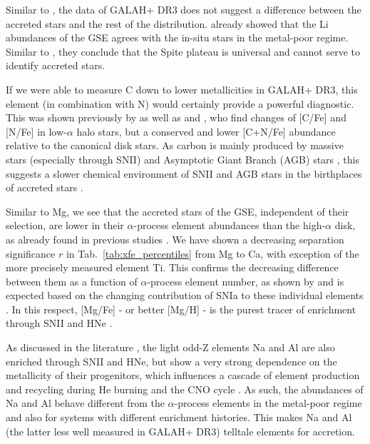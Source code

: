 \documentclass[fleqn,usenatbib]{mnras}
\begin{document}
Similar to \citet{Nissen2012}, the data of GALAH+ DR3 does not suggest a difference between the accreted stars and the rest of the distribution. \citet{Simpson2020} already showed that the Li abundances of the GSE agrees with the in-situ stars in the metal-poor regime. Similar to \citet{Molaro2020}, they conclude that the Spite plateau is universal and cannot serve to identify accreted stars.

If we were able to measure C down to lower metallicities in GALAH+ DR3, this element (in combination with N) would certainly provide a powerful diagnostic. This was shown previously by \citet{Nissen2014} as well as \citet{Hawkins2015} and \citet{Hayes2018}, who find changes of [C/Fe] and [N/Fe] in low-$\alpha$ halo stars, but a conserved and lower [C+N/Fe] abundance relative to the canonical disk stars. As carbon is mainly produced by massive stars (especially through SNII) and Asymptotic Giant Branch (AGB) stars \citep{Kobayashi2020}, this suggests a slower chemical environment of SNII and AGB stars in the birthplaces of accreted stars \citep[see][for further discussion]{Nissen2014}.

Similar to Mg, we see that the accreted stars of the GSE, independent of their selection, are lower in their $\alpha$-process element abundances than the high-$\alpha$ disk, as already found in previous studies \citep{Venn2004, Nissen2010, Hawkins2015, Hayes2018, Mackereth2019, Koppelman2019, Koppelman2021, Recio-Blanco2021, DiMatteo2020, Matsuno2021}. We have shown a decreasing separation significance $r$ in Tab.~\ref{tab:xfe_percentiles} from Mg to Ca, with exception of the more precisely measured element Ti. This confirms the decreasing difference between them as a function of $\alpha$-process element number, as shown by \citet{Hayes2018} and is expected based on the changing contribution of SNIa to these individual elements \citep{Tsujimoto1995}. In this respect, [Mg/Fe] - or better [Mg/H] \citep{Feuillet2021} - is the purest tracer of enrichment through SNII and HNe \citep{Kobayashi2020}.

As discussed in the literature \citep{Nissen2010, Hawkins2015, Hayes2018}, the light odd-Z elements Na and Al are also enriched through SNII and HNe, but show a very strong dependence on the metallicity of their progenitors, which influences a cascade of element production and recycling during He burning and the CNO cycle \citep[e.g.][]{Woosley2002, Kobayashi2006, Kobayashi2020}. As such, the abundances of Na and Al behave different from the $\alpha$-process elements in the metal-poor regime and also for systems with different enrichment histories. This makes Na and Al (the latter less well measured in GALAH+ DR3) telltale elements for accretion.
\end{document}
